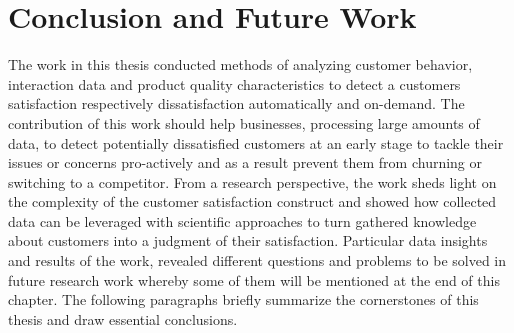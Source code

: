 \chapter{Conclusion and Future Work}
\label{ch:conclusion}

The work in this thesis conducted methods of analyzing customer behavior, interaction data and product quality characteristics to detect a customers satisfaction respectively dissatisfaction automatically and on-demand. The contribution of this work should help businesses, processing large amounts of data, to detect potentially dissatisfied customers at an early stage to tackle their issues or concerns pro-actively and as a result prevent them from churning or switching to a competitor. From a research perspective, the work sheds light on the complexity of the customer satisfaction construct and showed how collected data can be leveraged with scientific approaches to turn gathered knowledge about customers into a judgment of their satisfaction. Particular data insights and results of the work, revealed different questions and problems to be solved in future research work whereby some of them will be mentioned at the end of this chapter. The following paragraphs briefly summarize the cornerstones of this thesis and draw essential conclusions.

